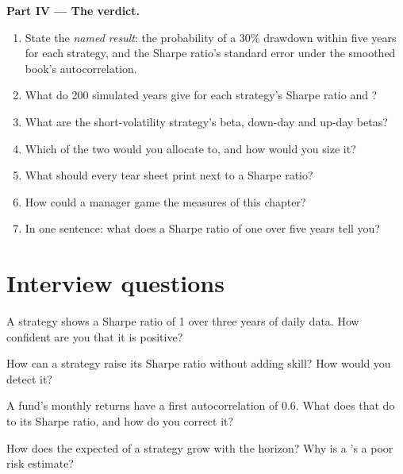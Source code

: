 \begin{problem}
\medskip\noindent\textbf{Part IV --- The verdict.}
\begin{enumerate}[resume]
\item State the \emph{named result}: the probability of a 30\% drawdown within five years for each strategy, and the Sharpe ratio's standard error under the
smoothed book's autocorrelation.
\item What do 200 simulated years give for each strategy's Sharpe ratio and ?
\item What are the short-volatility strategy's beta, down-day and up-day betas?
\item Which of the two would you allocate to, and how would you size it?
\item What should every tear sheet print next to a Sharpe ratio?
\item How could a manager game the measures of this chapter?
\item In one sentence: what does a Sharpe ratio of one over five years tell you?
\end{enumerate}
\end{problem}

\section{Interview questions}

\begin{interviewq}\label{iq:rs:performance-measurement:1}
A strategy shows a Sharpe ratio of 1 over three years of daily data. How confident are you that it is positive?
\end{interviewq}

\begin{interviewq}\label{iq:rs:performance-measurement:2}
How can a strategy raise its Sharpe ratio without adding skill? How would you detect it?
\end{interviewq}

\begin{interviewq}\label{iq:rs:performance-measurement:3}
A fund's monthly returns have a first autocorrelation of 0.6. What does that do to its Sharpe ratio, and how do you correct it?
\end{interviewq}

\begin{interviewq}\label{iq:rs:performance-measurement:4}
How does the expected  of a strategy grow with the horizon? Why is a 's  a poor risk estimate?
\end{interviewq}


